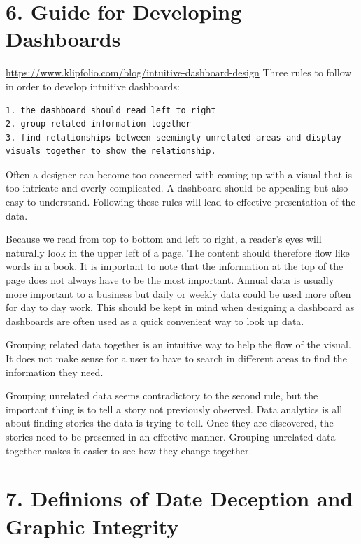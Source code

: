 \documentclass[]{book}
\theoremstyle{definition}
\theoremstyle{definition}
\theoremstyle{definition}
\theoremstyle{remark}
\begin{document}
\section{6. Guide for Developing
Dashboards}\label{guide-for-developing-dashboards}

\url{https://www.klipfolio.com/blog/intuitive-dashboard-design} Three
rules to follow in order to develop intuitive dashboards:

\begin{verbatim}
1. the dashboard should read left to right
2. group related information together
3. find relationships between seemingly unrelated areas and display visuals together to show the relationship.
\end{verbatim}

Often a designer can become too concerned with coming up with a visual
that is too intricate and overly complicated. A dashboard should be
appealing but also easy to understand. Following these rules will lead
to effective presentation of the data.

Because we read from top to bottom and left to right, a reader's eyes
will naturally look in the upper left of a page. The content should
therefore flow like words in a book. It is important to note that the
information at the top of the page does not always have to be the most
important. Annual data is usually more important to a business but daily
or weekly data could be used more often for day to day work. This should
be kept in mind when designing a dashboard as dashboards are often used
as a quick convenient way to look up data.

Grouping related data together is an intuitive way to help the flow of
the visual. It does not make sense for a user to have to search in
different areas to find the information they need.

Grouping unrelated data seems contradictory to the second rule, but the
important thing is to tell a story not previously observed. Data
analytics is all about finding stories the data is trying to tell. Once
they are discovered, the stories need to be presented in an effective
manner. Grouping unrelated data together makes it easier to see how they
change together.

\section{7. Definions of Date Deception and Graphic
Integrity}\label{definions-of-date-deception-and-graphic-integrity}
\end{document}
